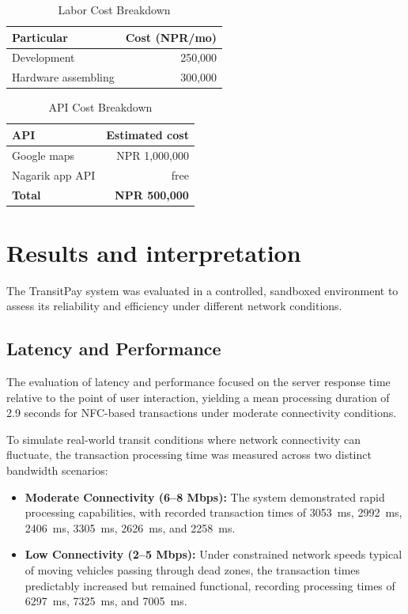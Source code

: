 \documentclass[sigconf, nonacm]{acmart}
\begin{document}
\begin{table}[H]
  \centering
  \caption{Labor Cost Breakdown}
  \label{tab:labor_cost}
  \begin{tabularx}{\columnwidth}{L r}
    \toprule
    \textbf{Particular} & \textbf{Cost (NPR/mo)} \\
    \midrule
    Development & 250,000 \\
    Hardware assembling & 300,000 \\
    \bottomrule
  \end{tabularx}
\end{table}


\begin{table}[H]
  \centering
  \caption{API Cost Breakdown}
  \label{tab:api_cost}
  \begin{tabularx}{\columnwidth}{L r}
    \toprule
    \textbf{API} & \textbf{Estimated cost} \\
    \midrule
    Google maps & NPR 1,000,000 \\
    Nagarik app API & free \\
    \midrule
    \textbf{Total} & \textbf{NPR 500,000} \\
    \bottomrule
  \end{tabularx}
\end{table}

\section{Results and interpretation }
The TransitPay system was evaluated in a controlled, sandboxed environment to assess its reliability and efficiency under different network conditions.
\subsection{Latency and Performance}
The evaluation of latency and performance focused on the server response time relative to the point of user interaction, yielding a mean processing duration of 2.9 seconds for NFC-based transactions under moderate connectivity conditions.

To simulate real-world transit conditions where network connectivity can fluctuate, the transaction processing time was measured across two distinct bandwidth scenarios:

\begin{itemize}
    \item \textbf{Moderate Connectivity (6--8 Mbps):} The system demonstrated rapid processing capabilities, with recorded transaction times of 3053~ms, 2992~ms, 2406~ms, 3305~ms, 2626~ms, and 2258~ms.
    \item \textbf{Low Connectivity (2--5 Mbps):} Under constrained network speeds typical of moving vehicles passing through dead zones, the transaction times predictably increased but remained functional, recording processing times of 6297~ms, 7325~ms, and 7005~ms.
\end{itemize}
\end{document}
